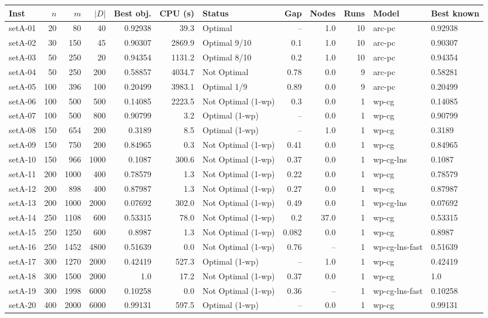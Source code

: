 \begin{tabular}{lrrrrrlrrrll}
\toprule
Inst & $n$ & $m$ & $|D|$ & Best obj. & CPU (s) & Status & Gap & Nodes & Runs & Model & Best known \\ \midrule
setA-01 & 20 & 80 & 40 & 0.92938 & 39.3 & Optimal & -- & 1.0 & 10 & arc-pc & 0.92938 \\
setA-02 & 30 & 150 & 45 & 0.90307 & 2869.9 & Optimal 9/10 & 0.1 & 1.0 & 10 & arc-pc & 0.90307 \\
setA-03 & 50 & 250 & 20 & 0.94354 & 1131.2 & Optimal 8/10 & 0.2 & 1.0 & 10 & arc-pc & 0.94354 \\
setA-04 & 50 & 250 & 200 & 0.58857 & 4034.7 & Not Optimal & 0.78 & 0.0 & 9 & arc-pc & 0.58281 \\
setA-05 & 100 & 396 & 100 & 0.20499 & 3983.1 & Optimal 1/9 & 0.89 & 0.0 & 9 & arc-pc & 0.20499 \\
setA-06 & 100 & 500 & 500 & 0.14085 & 2223.5 & Not Optimal (1-wp) & 0.3 & 0.0 & 1 & wp-cg & 0.14085 \\
setA-07 & 100 & 500 & 800 & 0.90799 & 3.2 & Optimal (1-wp) & -- & 0.0 & 1 & wp-cg & 0.90799 \\
setA-08 & 150 & 654 & 200 & 0.3189 & 8.5 & Optimal (1-wp) & -- & 1.0 & 1 & wp-cg & 0.3189 \\
setA-09 & 150 & 750 & 200 & 0.84965 & 0.3 & Not Optimal (1-wp) & 0.41 & 0.0 & 1 & wp-cg & 0.84965 \\
setA-10 & 150 & 966 & 1000 & 0.1087 & 300.6 & Not Optimal (1-wp) & 0.37 & 0.0 & 1 & wp-cg-lns & 0.1087 \\
setA-11 & 200 & 1000 & 400 & 0.78579 & 1.3 & Not Optimal (1-wp) & 0.22 & 0.0 & 1 & wp-cg & 0.78579 \\
setA-12 & 200 & 898 & 400 & 0.87987 & 1.3 & Not Optimal (1-wp) & 0.27 & 0.0 & 1 & wp-cg & 0.87987 \\
setA-13 & 200 & 1000 & 2000 & 0.07692 & 302.0 & Not Optimal (1-wp) & 0.49 & 0.0 & 1 & wp-cg-lns & 0.07692 \\
setA-14 & 250 & 1108 & 600 & 0.53315 & 78.0 & Not Optimal (1-wp) & 0.2 & 37.0 & 1 & wp-cg & 0.53315 \\
setA-15 & 250 & 1250 & 600 & 0.8987 & 1.3 & Not Optimal (1-wp) & 0.082 & 0.0 & 1 & wp-cg & 0.8987 \\
setA-16 & 250 & 1452 & 4800 & 0.51639 & 0.0 & Not Optimal (1-wp) & 0.76 & -- & 1 & wp-cg-lns-fast & 0.51639 \\
setA-17 & 300 & 1270 & 2000 & 0.42419 & 527.3 & Optimal (1-wp) & -- & 1.0 & 1 & wp-cg & 0.42419 \\
setA-18 & 300 & 1500 & 2000 & 1.0 & 17.2 & Not Optimal (1-wp) & 0.37 & 0.0 & 1 & wp-cg & 1.0 \\
setA-19 & 300 & 1998 & 6000 & 0.10258 & 0.0 & Not Optimal (1-wp) & 0.36 & -- & 1 & wp-cg-lns-fast & 0.10258 \\
setA-20 & 400 & 2000 & 6000 & 0.99131 & 597.5 & Optimal (1-wp) & -- & 0.0 & 1 & wp-cg & 0.99131 \\
\bottomrule
\end{tabular}
